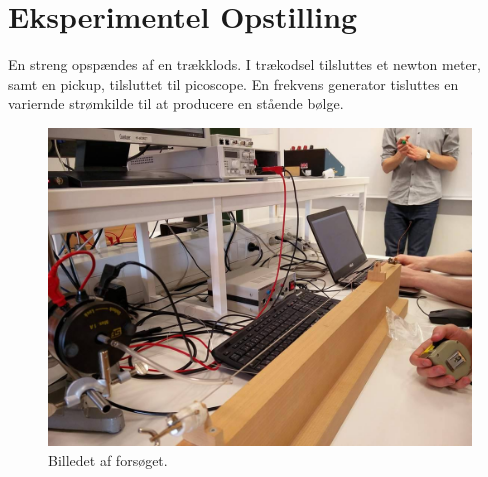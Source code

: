 \documentclass[A2_main.tex]{subfiles}
\begin{document}
\section{Eksperimentel Opstilling}
En streng opspændes af en trækklods. I trækodsel tilsluttes et newton meter, samt en pickup, tilsluttet til picoscope. En frekvens generator tisluttes en variernde strømkilde til at producere en stående bølge.
\begin{figure}[h!]
    \includegraphics[width=\linewidth]{opstilling.jpg}
    \caption{Billedet af forsøget.}
    \label{fig:opstilling}
\end{figure}
\end{document}
